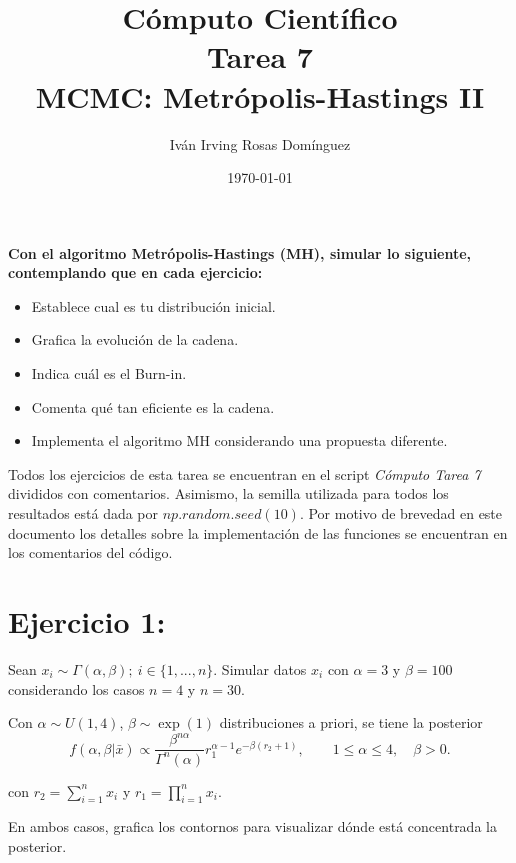 \documentclass[letterpaper]{article}
\title{\textbf{Cómputo Científico\\
Tarea 7\\
MCMC: Metrópolis-Hastings II}}
\author{Iván Irving Rosas Domínguez}
\date{\today}
\newcommand{\1}{\mathds{1}}
\theoremstyle{definition}
\theoremstyle{definition}
\theoremstyle{definition}
\theoremstyle{definition}
\theoremstyle{definition}
\begin{document}
\maketitle


\textbf{Con el algoritmo Metrópolis-Hastings (MH), simular lo siguiente, contemplando que en cada ejercicio:}
\begin{itemize}
    \item Establece cual es tu distribución inicial.
    \item Grafica la evolución de la cadena.
    \item Indica cuál es el Burn-in.
    \item Comenta qué tan eficiente es la cadena.
    \item Implementa el algoritmo MH considerando una propuesta diferente.
\end{itemize}
Todos los ejercicios de esta tarea se encuentran en el script \textit{Cómputo Tarea 7} divididos con comentarios.
Asimismo, la semilla utilizada para todos los resultados está dada por $np.random.seed(10)$. Por motivo de brevedad en este 
documento los detalles sobre la implementación de las funciones se encuentran en los comentarios del código.
\section*{Ejercicio 1:}
Sean $x_i\sim\Gamma(\alpha,\beta); \ i\in \{1,...,n\}$. Simular datos $x_i$ 
con $\alpha=3$ y $\beta=100$ considerando los casos $n=4$ y $n=30$.

Con $\alpha\sim U(1,4)$, $\beta\sim \exp(1)$ distribuciones a priori, se tiene la
posterior 
\[
f(\alpha,\beta|\bar{x})\propto\frac{\beta^{n\alpha}}{\Gamma^{n}(\alpha)}r_1^{\alpha-1}e^{-\beta(r_2+1)}, \qquad 1\leq \alpha\leq 4, \quad \beta>0.    
\]

con $r_2=\displaystyle \sum_{i=1}^nx_i$ y $r_1=\displaystyle\prod_{i=1}^{n}x_i$.

En ambos casos, grafica los contornos para visualizar dónde está concentrada la posterior.
\end{document}
